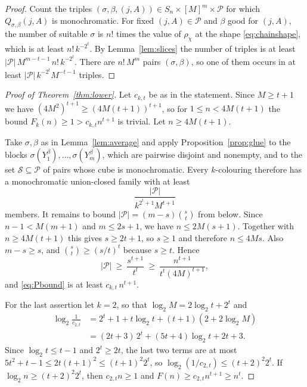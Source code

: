 \documentclass[11pt,reqno]{amsart}
\numberwithin{equation}{section}
\theoremstyle{plain}
\theoremstyle{definition}
\theoremstyle{remark}
\newcommand{\cP}{\mathcal{P}}
\newcommand{\cS}{\mathcal{S}}
\begin{document}
\begin{proof}
Count the triples $(\sigma,\beta,(j,A))\in S_n\times[M]^m\times\cP$ for
which $Q_{\sigma,\beta}(j,A)$ is monochromatic. For fixed $(j,A)\in\cP$
and $\beta$ good for $(j,A)$, the number of suitable $\sigma$ is $n!$
times the value of $\rho_\chi$ at the shape \eqref{eq:chainshape}, which
is at least $n!\,k^{-2^{t}}$. By Lemma~\ref{lem:slices} the number of
triples is at least $|\cP|\,M^{m-t-1}\,n!\,k^{-2^{t}}$. There are
$n!\,M^{m}$ pairs $(\sigma,\beta)$, so one of them occurs in at least
$|\cP|\,k^{-2^{t}}M^{-t-1}$ triples.
\end{proof}

\begin{proof}[Proof of Theorem~\ref{thm:lower}]
Let $c_{k,t}$ be as in the statement. Since $M\ge t+1$ we have
$(4M^{2})^{t+1}\ge(4M(t+1))^{t+1}$, so for $1\le n<4M(t+1)$ the bound
$F_k(n)\ge1>c_{k,t}n^{t+1}$ is trivial. Let $n\ge4M(t+1)$.

Take $\sigma,\beta$ as in Lemma~\ref{lem:average} and apply
Proposition~\ref{prop:glue} to the blocks
$\sigma(Y_1^\beta),\dots,\sigma(Y_m^\beta)$, which are pairwise disjoint
and nonempty, and to the set $\cS\subseteq\cP$ of pairs whose cube is
monochromatic. Every $k$-colouring therefore has a monochromatic
union-closed family with at least
\begin{equation}
\label{eq:Pbound}
\frac{|\cP|}{k^{2^{t}+1}M^{t+1}}
\end{equation}
members. It remains to bound $|\cP|=(m-s)\binom st$ from below. Since
$n-1<M(m+1)$ and $m\le2s+1$, we have $n\le2M(s+1)$. Together with
$n\ge4M(t+1)$ this gives $s\ge2t+1$, so $s\ge1$ and therefore $n\le4Ms$.
Also $m-s\ge s$, and $\binom st\ge(s/t)^{t}$ because $s\ge t$. Hence
\[
|\cP|\ \ge\ \frac{s^{t+1}}{t^{t}}\ \ge\
\frac{n^{t+1}}{t^{t}(4M)^{t+1}},
\]
and \eqref{eq:Pbound} is at least $c_{k,t}\,n^{t+1}$.

For the last assertion let $k=2$, so that $\log_2M=2\log_2t+2^{t}$ and
\begin{align*}
\log_2\frac1{c_{2,t}}&=2^{t}+1+t\log_2t+(t+1)(2+2\log_2M)\\
&=(2t+3)\,2^{t}+(5t+4)\log_2t+2t+3 .
\end{align*}
Since $\log_2t\le t-1$ and $2^{t}\ge2t$, the last two terms are at most
$5t^{2}+t-1\le2t(t+1)^{2}\le(t+1)^{2}2^{t}$, so
$\log_2(1/c_{2,t})\le(t+2)^{2}2^{t}$. If $\log_2n\ge(t+2)^{2}2^{t}$, then
$c_{2,t}n\ge1$ and $F(n)\ge c_{2,t}n^{t+1}\ge n^{t}$.
\end{proof}
\end{document}
